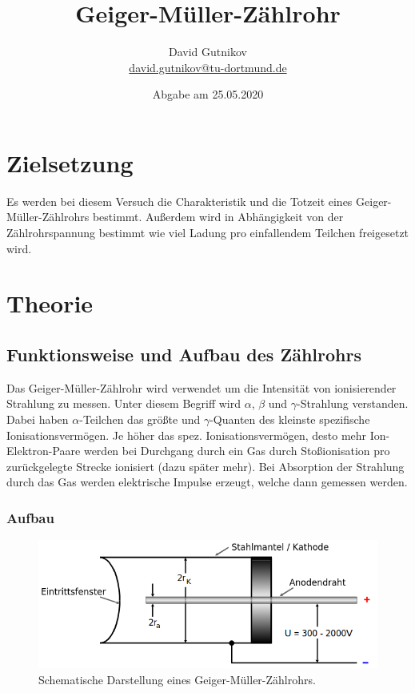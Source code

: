 \documentclass[titlepage = firstcover]{scrartcl}
\title{Geiger-Müller-Zählrohr}
\author{David Gutnikov \\
        \href{mailto:david.gutnikov@tu-dortmund.de}{david.gutnikov@tu-dortmund.de}}
\date{Abgabe am 25.05.2020}
\begin{document}
    \maketitle
    \newpage
    \tableofcontents
    \newpage

    \section{Zielsetzung}
      Es werden bei diesem Versuch die Charakteristik und die Totzeit eines Geiger-Müller-Zählrohrs bestimmt. Außerdem wird in Abhängigkeit von der Zählrohrspannung bestimmt wie viel Ladung pro einfallendem Teilchen freigesetzt wird.

    \section{Theorie}
      \subsection{Funktionsweise und Aufbau des Zählrohrs}
        Das Geiger-Müller-Zählrohr wird verwendet um die Intensität von ionisierender Strahlung zu messen. Unter diesem Begriff wird $\alpha$, $\beta$ und $\gamma$-Strahlung verstanden. Dabei haben $\alpha$-Teilchen das größte und $\gamma$-Quanten des kleinste spezifische Ionisationsvermögen. Je höher das spez. Ionisationsvermögen, desto mehr Ion-Elektron-Paare werden bei Durchgang durch ein Gas durch Stoßionisation pro zurückgelegte Strecke ionisiert (dazu später mehr). Bei Absorption der Strahlung durch das Gas werden elektrische Impulse erzeugt, welche dann gemessen werden.
        \subsubsection{Aufbau}
          \begin{figure}[h]
            \centering
            \includegraphics[width = 0.8\linewidth]{geiger_mueller_aufbau.png}
            \caption{Schematische Darstellung eines Geiger-Müller-Zählrohrs.}
            \label{fig:geiger-mueller-zaehlrohr}
          \end{figure}
          \FloatBarrier
              
\end{document}
